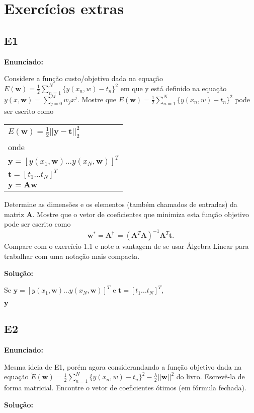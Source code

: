 \section{Exercícios extras}

\subsection{E1}
\textbf{Enunciado:} \par
Considere a função custo/objetivo dada na equação $E(\textbf{w})=\frac{1}{2}\sum_{n=1}^{N} \{y(x_n,w)-t_n\}^2$ em que y está definido na equação $y(x,\boldsymbol{w}) = \sum_{j=0}^{M} w_jx^j$. Mostre que $E(\textbf{w})=\frac{1}{2}\sum_{n=1}^{N} \{y(x_n,w)-t_n\}^2$ pode ser escrito como
\begin{center}
    \begin{tabular}{l}
        $E(\boldsymbol{w}) = \frac{1}{2}||\boldsymbol{y}-\boldsymbol{t}||^2_2$  \\
        onde \\
        $\boldsymbol{y} = [y(x_1,\boldsymbol{w})...y(x_N,\boldsymbol{w})]^T$\\
        $\boldsymbol{t}=[t_1...t_N]^T$\\
        $\boldsymbol{y} = \boldsymbol{A} \boldsymbol{w}$
    \end{tabular}       
\end{center}
Determine as dimensões e os elementos (também chamados de entradas) da matriz $\boldsymbol{A}$. Mostre que o vetor de coeficientes que minimiza esta função objetivo pode ser escrito como
\begin{equation*}
    \boldsymbol{w}^{*} = \boldsymbol{A}^\dagger\ = (\boldsymbol{A}^T\boldsymbol{A})^{-1}\boldsymbol{A}^T\boldsymbol{t}.
\end{equation*}
Compare com o exercício 1.1 e note a vantagem de se usar Álgebra Linear para trabalhar com uma notação mais compacta.
\newline \par
\textbf{Solução:}

Se $\boldsymbol{y} = [y(x_1,\boldsymbol{w})...y(x_N,\boldsymbol{w})]^T$
e  $\boldsymbol{t} = [t_1...t_N]^T$,

$ \boldsymbol{y} $


\subsection{E2}
\textbf{Enunciado:} \par
Mesma ideia de E1, porém agora considerandando a função objetivo dada na equação $\tilde{E}(\textbf{w})=\frac{1}{2}\sum_{n=1}^{N} \{y(x_n,w)-t_n\}^2-\frac{\lambda}{2}||\boldsymbol{w}||^2$ do livro. Escrevê-la de forma matricial. Encontre o vetor de coeficientes ótimos (em fórmula fechada).
\newline \par
\textbf{Solução:}

